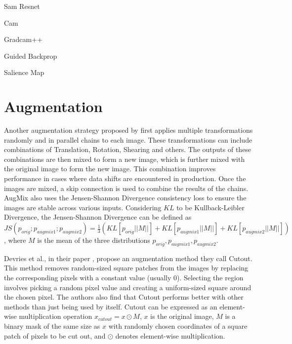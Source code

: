 Sam Resnet

Cam

Gradcam++

Guided Backprop

Salience Map



\section{Augmentation} \label{sec:augmentation}
Another augmentation strategy proposed by \cite{hendrycksAugMixSimpleData2020} first applies multiple transformations randomly and in parallel chains to each image. These transformations can include combinations of Translation, Rotation, Shearing and others. The outputs of these combinations are then mixed to form a new image, which is further mixed with the original image to form the new image. This combination improves performance in cases where data shifts are encountered in production. Once the images are mixed, a skip connection is used to combine the results of the chains. AugMix also uses the Jensen-Shannon Divergence consistency loss \cite{linDivergenceMeasuresBased} to ensure the images are stable across various inputs. Considering $KL$ to be Kullback-Leibler Divergence, the Jensen-Shannon Divergence can be defined as $
    JS(p_{orig}; p_{augmix1};p_{augmix2}) = \frac{1}{3}(KL[p_{orig}||M||]+KL[p_{augmix1}||M||]+KL[p_{augmix2}||M||])
$, where $M$ is the mean of the three distributions $p_{orig}, p_{augmix1}, p_{augmix2}$.

Devries et al., in their paper \cite{devriesImprovedRegularizationConvolutional2017}, propose an augmentation method they call Cutout. This method removes random-sized square patches from the images by replacing the corresponding pixels with a constant value (usually 0). Selecting the region involves picking a random pixel value and creating a uniform-sized square around the chosen pixel. The authors also find that Cutout performs better with other methods than just being used by itself. Cutout can be expressed as an element-wise multiplication operation $x_{cutout} = x \odot M$,
$x$ is the original image, $M$ is a binary mask of the same size as $x$ with randomly chosen coordinates of a square patch of pixels to be cut out, and $\odot$ denotes element-wise multiplication.

